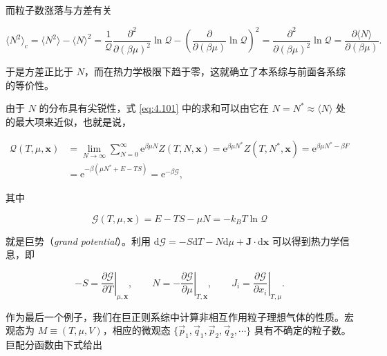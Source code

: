 而粒子数涨落与方差有关

\begin{equation}\label{eq:4.104}
  \langle N^2\rangle_c=\langle N^2\rangle-\langle N\rangle^2=\frac{1}{\mathcal{Q}}\frac{\partial^2}{\partial(\beta\mu)^2}\ln\mathcal{Q}-\left(\frac{\partial}{\partial(\beta\mu)}\ln\mathcal{Q}\right)^2=\frac{\partial^2}{\partial(\beta\mu)^2}\ln\mathcal{Q}=\frac{\partial\langle N\rangle}{\partial(\beta\mu)}.
\end{equation}

于是方差正比于 $N$，而在热力学极限下趋于零，这就确立了本系综与前面各系综的等价性。

由于 $N$ 的分布具有尖锐性，式 \eqref{eq:4.101} 中的求和可以由它在 $N=N^*\approx\langle N\rangle$ 处的最大项来近似，也就是说，

\begin{equation}\label{eq:4.105}
  \begin{aligned}
    \mathcal{Q}(T,\mu,\mathbf x)&=\lim_{N\to\infty}\sum_{N=0}^\infty\mathrm{e}^{\beta\mu N}Z(T,N,\mathbf x)=\mathrm{e}^{\beta\mu N^*}Z(T,N^*,\mathbf x)=\mathrm{e}^{\beta\mu N^*-\beta F}\\
    &=\mathrm{e}^{-\beta(\mu N^*+E-TS)}=\mathrm{e}^{-\beta\mathcal{G}},
  \end{aligned}
\end{equation}

其中

\begin{equation}\label{eq:4.106}
  \mathcal{G}(T,\mu,\mathbf x)=E-TS-\mu N=-k_BT\ln\mathcal{Q}
\end{equation}

就是巨势（\textit{grand potential}）。利用 $\mathrm{d}\mathcal{G}=-S\mathrm{d}T-N\mathrm{d}\mu+\mathbf J\cdot\mathrm{d}\mathbf x$ 可以得到热力学信息，即

\begin{equation}\label{eq:4.107}
  -S=\left.\frac{\partial\mathcal{G}}{\partial T}\right|_{\mu,\mathbf x},\qquad
  N=-\left.\frac{\partial\mathcal{G}}{\partial\mu}\right|_{T,\mathbf x},\qquad
  J_i=\left.\frac{\partial\mathcal{G}}{\partial x_i}\right|_{T,\mu}.
\end{equation}

作为最后一个例子，我们在巨正则系综中计算非相互作用粒子理想气体的性质。宏观态为 $M\equiv(T,\mu,V)$，相应的微观态 $\{\vec p_1,\vec q_1,\vec p_2,\vec q_2,\cdots\}$ 具有不确定的粒子数。巨配分函数由下式给出

